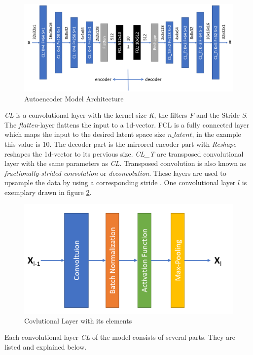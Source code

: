 \documentclass[12pt,DIV14,BCOR12mm,a4paper,footexclude,headinclude,halfparskip-,twoside,openright,cleardoubleempty,idxtotoc,bibtotoc,listtotoc]{scrreprt} %
\numberwithin{equation}{chapter}
\begin{document}
\begin{figure}[htb!]
	\centering
	\includegraphics[width=0.9\linewidth]{Graphiken/Autoencoder_Model}
	\caption{Autoencoder Model Architecture}
	\label{fig:AE_ModelArchitecture}
\end{figure}
\textit{CL} is a convolutional layer with the kernel size \textit{K}, the filters \textit{F} and the Stride \textit{S}. The \textit{flatten}-layer flattens the input to a 1d-vector. FCL is a fully connected layer which maps the input to the desired latent space size $n\_latent$, in the example this value is $10$. The decoder part is the mirrored encoder part with \textit{Reshape} reshapes the 1d-vector to its pervious size. \textit{CL\_T} are transposed convolutional layer with the same parameters as \textit{CL}. Transposed convolution is also known as \textit{fractionally-strided convolution} or \textit{deconvolution}. These layers are used to upsample the data by using a corresponding stride \cite{DeepLearningDive}. One convolutional layer $l$ is exemplary drawn in figure \ref{fig:Conv_layer}.
\begin{figure}[htb!]
	\centering
	\includegraphics[width=0.5\linewidth]{Graphiken/ConvolutionalLayer}
	\caption{Covlutional Layer with its elements}
	\label{fig:Conv_layer}
\end{figure}
Each convolutional layer \textit{CL} of the model consists of several parts. They are listed and explained below.\\
\end{document}
